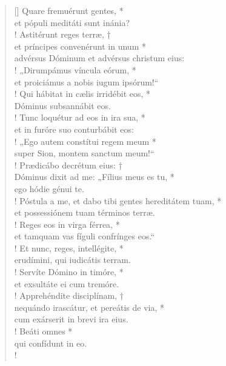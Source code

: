\begin{verse}[\versewidth]
Quare fremuérunt gentes, *\\
et pópuli meditáti sunt inánia?\\!
\vin Astitérunt reges terræ, †\\
\vin et príncipes convenérunt in unum *\\
\vin advérsus Dóminum et advérsus christum eius:\\!
„Dirumpámus víncula eórum, *\\
et proiciámus a nobis iugum ipsórum!“\\!
\vin Qui hábitat in cælis irridébit eos, *\\
\vin Dóminus subsannábit eos.\\!
Tunc loquétur ad eos in ira sua, *\\
et in furóre suo conturbábit eos:\\!
\vin „Ego autem constítui regem meum *\\
\vin super Sion, montem sanctum meum!“\\!
Prædicábo decrétum eius: †\\
Dóminus dixit ad me: „Fílius meus es tu, *\\
ego hódie génui te.\\!
\vin Póstula a me, et dabo tibi gentes hereditátem tuam, *\\
\vin et possessiónem tuam términos terræ.\\!
Reges eos in virga férrea, *\\
et tamquam vas fíguli confrínges eos.“\\!
\vin Et nunc, reges, intellégite, *\\
\vin erudímini, qui iudicátis terram.\\!
Servíte Dómino in timóre, *\\
et exsultáte ei cum tremóre.\\!
\vin Apprehéndite disciplínam, †\\
\vin nequándo irascátur, et pereátis de via, *\\
\vin cum exárserit in brevi ira eius.\\!
Beáti omnes *\\
qui confídunt in eo.\\!

\end{verse}
\vspace{1cm}


